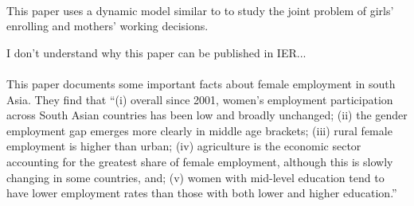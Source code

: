 \paragraph{\citet{Reis2020}}

This paper uses a dynamic model similar to \citet{AttanasioMeghirSantiago2011} to study the joint problem of girls' enrolling and mothers' working decisions.

I don't understand why this paper can be published in IER...

\paragraph{\citet[IZA WP]{NajeebMoraleLopez-Acevedo2020}}

This paper documents some important facts about female employment in south Asia.
They find that 
``(i) overall since 2001, women’s employment participation across South Asian countries has been low and broadly unchanged; (ii) the gender employment gap emerges more clearly in middle age brackets; (iii) rural female employment is higher than urban; (iv) agriculture is the economic sector accounting for the greatest share of female employment, although this is slowly changing in some countries, and; (v) women with mid-level education tend to have lower employment rates than those with both lower and higher education.''



\clearpage
\singlespacing
\printbibliography
% 
% 
% 

